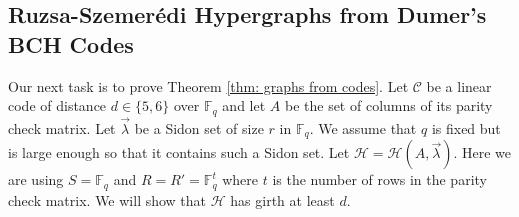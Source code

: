 \documentclass[12pt]{article}%
\def\katie#1{\noindent
\textcolor{blue}
{\textsc{(Katie:}
\textsf{#1})}}
\begin{document}






\subsection{Ruzsa-Szemer\'{e}di Hypergraphs from Dumer's BCH Codes}


  Our next task is to prove Theorem \ref{thm: graphs from codes}. Let $\mathcal{C}$ be a linear code of distance $d\in \{5,6\}$ over $\mathbb{F}_q$ and let $A$ be the set of columns of its parity check matrix. Let $\vec{\lambda}$ be a Sidon set of size $r$ in $\mathbb{F}_q$. We assume that $q$ is fixed but is large enough so that it contains such a Sidon set. Let $\mathcal{H} = \mathcal{H}(A,\vec{\lambda})$. Here we are using $S = \mathbb{F}_q$ and $R = R' = \mathbb{F}_q^t$ where $t$ is the number of rows in the parity check matrix. We will show that $\mathcal{H}$ has girth at least $d$.
\end{document}
